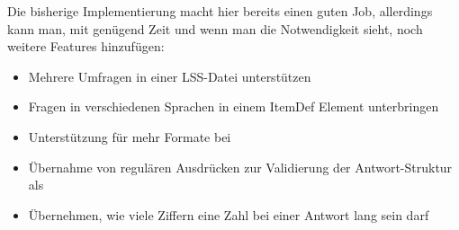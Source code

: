 Die bisherige Implementierung macht hier bereits einen guten Job, allerdings kann man, mit genügend Zeit und wenn man die Notwendigkeit sieht, noch weitere Features hinzufügen:

\begin{itemize}
	\item Mehrere Umfragen in einer LSS-Datei unterstützen
	\item Fragen in verschiedenen Sprachen in einem ItemDef Element unterbringen
	\item Unterstützung für mehr Formate bei 
	\item Übernahme von regulären Ausdrücken zur Validierung der Antwort-Struktur als 
	\item Übernehmen, wie viele Ziffern eine Zahl bei einer Antwort lang sein darf
\end{itemize}
